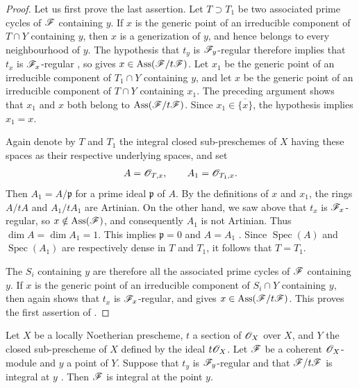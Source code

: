 \begin{proof}
Let us first prove the last assertion.
Let $T\supset T_1$ be two associated prime cycles of $\mathscr{F}$ containing $y$.
If $x$ is the generic point of an irreducible component of $T\cap Y$ containing $y$, then $x$ is a generization of $y$, and hence belongs to every neighbourhood of $y$.
The hypothesis that $t_y$ is $\mathscr{F}_y$-regular therefore implies that $t_x$ is $\mathscr{F}_x$-regular , so  gives $x\in\operatorname{Ass}(\mathscr{F}/t\mathscr{F})$.
Let $x_1$ be the generic point of an irreducible component of $T_1\cap Y$ containing $y$, and let $x$ be the generic point of an irreducible component of $T\cap Y$ containing $x_1$.
The preceding argument shows that $x_1$ and $x$ both belong to $\operatorname{Ass}(\mathscr{F}/t\mathscr{F})$.
Since $x_1\in\overline{\{x\}}$, the hypothesis implies $x_1=x$.

Again denote by $T$ and $T_1$ the integral closed sub-preschemes of $X$ having these spaces as their respective underlying spaces, and set
\[
A=\mathscr{O}_{T,x},
\qquad
A_1=\mathscr{O}_{T_1,x}.
\]
Then $A_1=A/\mathfrak p$ for a prime ideal $\mathfrak p$ of $A$.
By the definitions of $x$ and $x_1$, the rings $A/tA$ and $A_1/tA_1$ are Artinian.
On the other hand, we saw above that $t_x$ is $\mathscr{F}_x$-regular, so $x\notin\operatorname{Ass}(\mathscr{F})$, and consequently $A_1$ is not Artinian.
Thus $\dim A=\dim A_1=1$.
This implies $\mathfrak p=0$ and $A=A_1$ .
Since $\operatorname{Spec}(A)$ and $\operatorname{Spec}(A_1)$ are respectively dense in $T$ and $T_1$, it follows that $T=T_1$.

The $S_i$ containing $y$ are therefore all the associated prime cycles of $\mathscr{F}$ containing $y$.
If $x$ is the generic point of an irreducible component of $S_i\cap Y$ containing $y$, then  again shows that $t_x$ is $\mathscr{F}_x$-regular, and  gives $x\in\operatorname{Ass}(\mathscr{F}/t\mathscr{F})$.
This proves the first assertion of .
\end{proof}

\begin{proposition}[3.4.5]
\label{IV.3.4.5}
Let $X$ be a locally Noetherian prescheme, $t$ a section of $\mathscr{O}_X$ over $X$, and $Y$ the closed sub-prescheme of $X$ defined by the ideal $t\mathscr{O}_X$.
Let $\mathscr{F}$ be a coherent $\mathscr{O}_X$-module and $y$ a point of $Y$.
Suppose that $t_y$ is $\mathscr{F}_y$-regular and that $\mathscr{F}/t\mathscr{F}$ is integral at $y$ .
Then $\mathscr{F}$ is integral at the point $y$.
\end{proposition}

